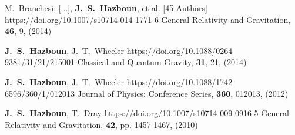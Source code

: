          {M.~{Branchesi}, [...], \textbf{J.~S.~{Hazboun}}, et al. [45 Authors]}
         {https://doi.org/10.1007/s10714-014-1771-6}
         {{General Relativity and Gravitation}, \textbf{46}, 9, (2014)}

         {\textbf{J.~S.~Hazboun}, J.~T.~Wheeler}
         {https://doi.org/10.1088/0264-9381/31/21/215001}
         {{Classical and Quantum Gravity}, \textbf{31}, 21, (2014)}

         {\textbf{J.~S.~Hazboun}, J.~T.~{Wheeler}}
         {https://doi.org/10.1088/1742-6596/360/1/012013}
         {{Journal of Physics: Conference Series}, \textbf{360}, 012013, (2012)}

         {\textbf{J.~S.~Hazboun}, T.~{Dray}}
         {https://doi.org/10.1007/s10714-009-0916-5}
         {{General Relativity and Gravitation}, \textbf{42}, pp. 1457-1467, (2010)}


